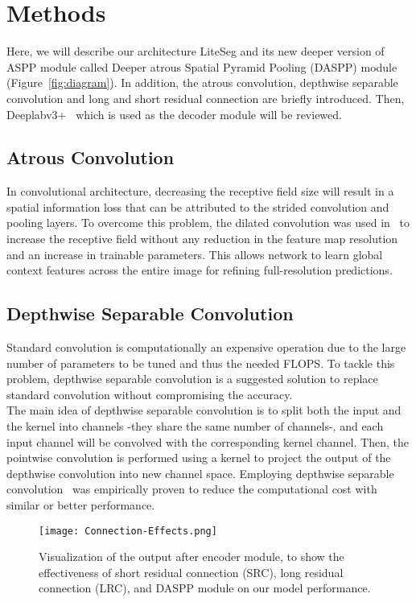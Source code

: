 \documentclass[conference,a4paper]{IEEEtran}
\begin{document}
\section{Methods}
\label{sec:1}
Here, we will describe our architecture LiteSeg and its new deeper version of ASPP module called Deeper atrous Spatial Pyramid Pooling (DASPP) module (Figure~\ref{fig:diagram}). In addition, the atrous convolution, depthwise separable convolution and long and short residual connection are briefly introduced. Then, Deeplabv3+~\cite{deeplabv3plus} which is used as the decoder module will be reviewed.
\subsection{Atrous Convolution}
\label{sec:2}
In convolutional architecture, decreasing the receptive field size will result in a spatial information loss that can be attributed to the strided convolution and pooling layers. To overcome this problem, the dilated convolution was used in~\cite{chen2018deeplab, yu2015multi} to increase the receptive field without any reduction in the feature map resolution and an increase in trainable parameters. This allows network to learn global context features across the entire image for refining full-resolution predictions. 

\subsection{Depthwise Separable Convolution}
\label{sec:3}
Standard convolution is computationally an expensive operation due to the large number of parameters to be tuned and thus the needed FLOPS. To tackle this problem, depthwise separable convolution is a suggested solution to replace standard convolution without compromising the accuracy.\\ 
The main idea of depthwise separable convolution is to split both the input and the kernel into channels -they share the same number of channels-, and each input channel will be convolved with the corresponding kernel channel. Then, the pointwise convolution is performed using a  kernel to project the output of the depthwise convolution into new channel space. Employing depthwise separable convolution~\cite{Nekrasov2018LightWeightRF} was empirically proven to reduce the computational cost with similar or better performance.
\begin{figure*}[h]
    \centering
    \texttt{[image: Connection-Effects.png]}
    \caption{Visualization of the output after encoder module, to show the effectiveness of short residual connection (SRC), long residual connection (LRC), and DASPP module on our model performance. }
    \label{fig:mesh1}
\end{figure*}
\end{document}
